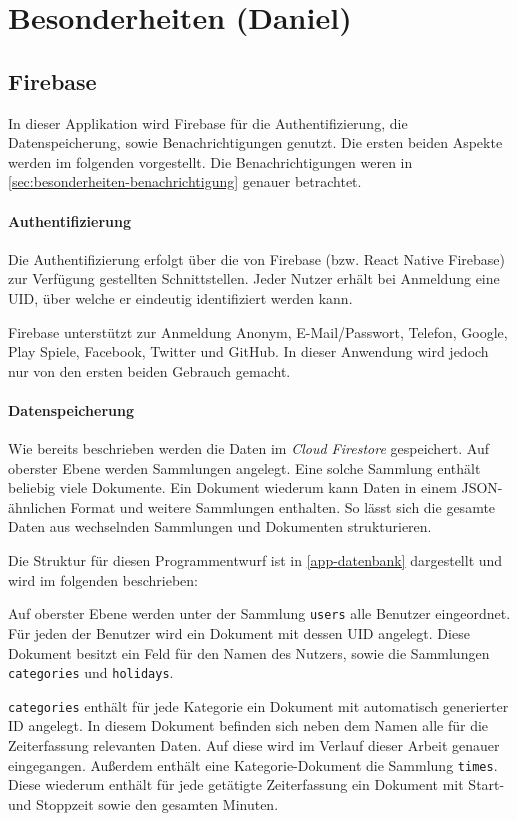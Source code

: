 \section{Besonderheiten (Daniel)}
\subsection{Firebase}
In dieser Applikation wird Firebase für die Authentifizierung,
die Datenspeicherung, sowie Benachrichtigungen genutzt.
Die ersten beiden Aspekte werden im folgenden vorgestellt.
Die Benachrichtigungen weren in \autoref{sec:besonderheiten-benachrichtigung} genauer betrachtet.

\paragraph{Authentifizierung}
Die Authentifizierung erfolgt über die von Firebase (bzw. React Native Firebase) zur Verfügung gestellten Schnittstellen.
Jeder Nutzer erhält bei Anmeldung eine UID, über welche er eindeutig identifiziert werden kann.

Firebase unterstützt zur Anmeldung Anonym, E-Mail/Passwort, Telefon, Google, Play Spiele, Facebook, Twitter und GitHub.
In dieser Anwendung wird jedoch nur von den ersten beiden Gebrauch gemacht.



\paragraph{Datenspeicherung}
Wie bereits beschrieben werden die Daten im \textit{Cloud Firestore} gespeichert.
Auf oberster Ebene werden Sammlungen angelegt.
Eine solche Sammlung enthält beliebig viele Dokumente.
Ein Dokument wiederum kann Daten in einem JSON-ähnlichen Format und weitere Sammlungen enthalten.
So lässt sich die gesamte Daten aus wechselnden Sammlungen und Dokumenten strukturieren.

Die Struktur für diesen Programmentwurf ist in \autoref{app-datenbank} dargestellt und wird im folgenden beschrieben:

Auf oberster Ebene werden unter der Sammlung \texttt{users} alle Benutzer eingeordnet.
Für jeden der Benutzer wird ein Dokument mit dessen UID angelegt.
Diese Dokument besitzt ein Feld für den Namen des Nutzers,
sowie die Sammlungen \texttt{categories} und \texttt{holidays}.

\texttt{categories} enthält für jede Kategorie ein Dokument mit automatisch generierter ID angelegt.
In diesem Dokument befinden sich neben dem Namen alle für die Zeiterfassung relevanten Daten.
Auf diese wird im Verlauf dieser Arbeit genauer eingegangen.
Außerdem enthält eine Kategorie-Dokument die Sammlung \texttt{times}.
Diese wiederum enthält für jede getätigte Zeiterfassung ein Dokument mit Start- und Stoppzeit sowie den gesamten Minuten.

